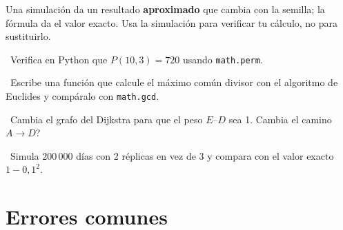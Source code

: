 \begin{tmcuidado}Una simulaci\'on da un resultado \textbf{aproximado} que cambia con la semilla; la f\'ormula da el valor exacto. Usa la simulaci\'on para verificar tu c\'alculo, no para sustituirlo.\end{tmcuidado}

\begin{tmejercicios}
\begin{tmlista}
\item \tmbasico\ Verifica en Python que $P(10, 3)=720$ usando \texttt{math.perm}.
\item \tmmedio\ Escribe una funci\'on que calcule el m\'aximo com\'un divisor con el algoritmo de Euclides y comp\'aralo con \texttt{math.gcd}.
\item \tmmedio\ Cambia el grafo del Dijkstra para que el peso $E$--$D$ sea 1. \textquestiondown Cambia el camino $A\to D$?
\item \tmdificil\ Simula 200\,000 d\'ias con 2 r\'eplicas en vez de 3 y compara con el valor exacto $1-0{,}1^2$.
\end{tmlista}
\end{tmejercicios}

\chapter{Errores comunes}

